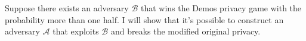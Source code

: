  
 Suppose there exists an adversary $\mathcal{B}$ that wins the Demos privacy game with the probability more than one half. I will show that it's possible to construct an adversary $\mathcal{A}$ that exploits $\mathcal{B}$ and breaks the modified original privacy. \\

